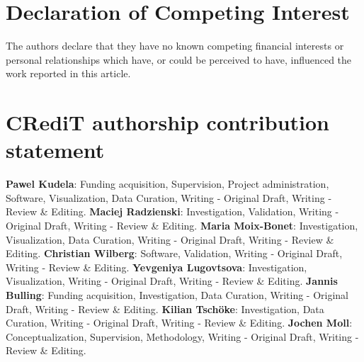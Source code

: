 \documentclass[times,final]{elsarticle}
\begin{document}
\section*{Declaration of Competing Interest}

The authors declare that they have no known competing
financial interests or personal relationships which have, or could be
perceived to have, influenced the work reported in this article. 

\section*{CRediT authorship contribution statement}
\textbf{Pawel Kudela}: Funding acquisition, Supervision, Project administration, Software, Visualization, Data Curation, Writing - Original Draft, Writing - Review \& Editing.
\textbf{Maciej Radzienski}: Investigation, Validation, Writing - Original Draft, Writing - Review \& Editing. \textbf{Maria Moix-Bonet}: Investigation, Visualization, Data Curation, Writing - Original Draft, Writing - Review \& Editing. \textbf{Christian Wilberg}: Software, Validation, Writing - Original Draft, Writing - Review \& Editing.
\textbf{Yevgeniya Lugovtsova}: Investigation, Visualization, Writing - Original Draft, Writing - Review \& Editing.
\textbf{Jannis Bulling}: Funding acquisition, Investigation, Data Curation, Writing - Original Draft, Writing - Review \& Editing. \textbf{Kilian Tsch\"oke}: Investigation, Data Curation, Writing - Original Draft, Writing - Review \& Editing. \textbf{Jochen Moll}: Conceptualization, Supervision, Methodology, Writing - Original Draft, Writing - Review \& Editing.


%

\end{document}
